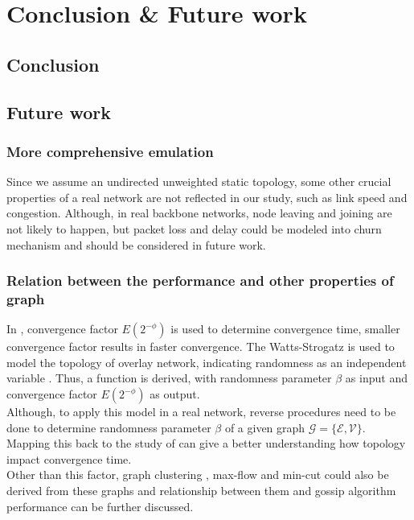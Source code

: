 \section{Conclusion \& Future work}
\label{sec:conclusion}

\subsection{Conclusion}
\subsection{Future work}
\subsubsection{More comprehensive emulation}
Since we assume an undirected unweighted static topology, some other crucial properties of a real network are not reflected in our study, such as link speed and congestion. Although, in real backbone networks, node leaving and joining are not likely to happen, but packet loss and delay could be modeled into churn mechanism and should be considered in future work.\\

\subsubsection{Relation between the performance and other properties of graph}
In \cite{jelasity_gossip-based_2005}, convergence factor $E(2^{-\phi})$ is used to determine convergence time, smaller convergence factor results in faster convergence. The Watts-Strogatz is used to model the topology of overlay network, indicating randomness as an independent variable \cite{Watts1998}. Thus, a function is derived, with randomness parameter $\beta$ as input and convergence factor $E(2^{-\phi})$ as output.\\
Although, to apply this model in a real network, reverse procedures need to be done to determine randomness parameter $\beta$ of a given graph $\mathcal{G}=\{\mathcal{E}, \mathcal{V}\}$. Mapping this back to the study of \cite{jelasity_gossip-based_2005} can give a better understanding how topology impact convergence time.\\
Other than this factor, graph clustering \cite{Schaeffer200727}, max-flow and min-cut \cite{PapadimitriouS82} could also be derived from these graphs and relationship between them and gossip algorithm performance can be further discussed.\\
